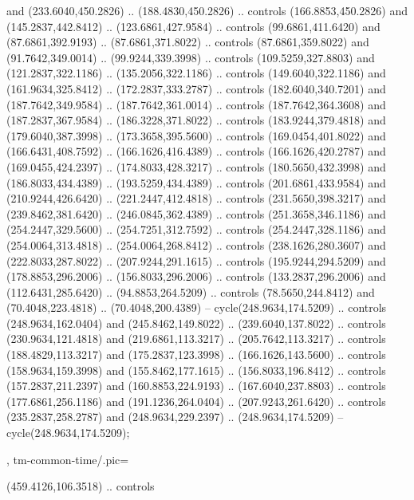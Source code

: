 {{\begin{scope}[y=-0.80pt,x=0.80pt,scale=0.04,yshift=220pt,xshift=-160pt]
        and (233.6040,450.2826) .. (188.4830,450.2826) .. controls (166.8853,450.2826)
        and (145.2837,442.8412) .. (123.6861,427.9584) .. controls (99.6861,411.6420)
        and (87.6861,392.9193) .. (87.6861,371.8022) .. controls (87.6861,359.8022)
        and (91.7642,349.0014) .. (99.9244,339.3998) .. controls (109.5259,327.8803)
        and (121.2837,322.1186) .. (135.2056,322.1186) .. controls (149.6040,322.1186)
        and (161.9634,325.8412) .. (172.2837,333.2787) .. controls (182.6040,340.7201)
        and (187.7642,349.9584) .. (187.7642,361.0014) .. controls (187.7642,364.3608)
        and (187.2837,367.9584) .. (186.3228,371.8022) .. controls (183.9244,379.4818)
        and (179.6040,387.3998) .. (173.3658,395.5600) .. controls (169.0454,401.8022)
        and (166.6431,408.7592) .. (166.1626,416.4389) .. controls (166.1626,420.2787)
        and (169.0455,424.2397) .. (174.8033,428.3217) .. controls (180.5650,432.3998)
        and (186.8033,434.4389) .. (193.5259,434.4389) .. controls (201.6861,433.9584)
        and (210.9244,426.6420) .. (221.2447,412.4818) .. controls (231.5650,398.3217)
        and (239.8462,381.6420) .. (246.0845,362.4389) .. controls (251.3658,346.1186)
        and (254.2447,329.5600) .. (254.7251,312.7592) .. controls (254.2447,328.1186)
        and (254.0064,313.4818) .. (254.0064,268.8412) .. controls (238.1626,280.3607)
        and (222.8033,287.8022) .. (207.9244,291.1615) .. controls (195.9244,294.5209)
        and (178.8853,296.2006) .. (156.8033,296.2006) .. controls (133.2837,296.2006)
        and (112.6431,285.6420) .. (94.8853,264.5209) .. controls (78.5650,244.8412)
        and (70.4048,223.4818) .. (70.4048,200.4389) -- cycle(248.9634,174.5209) ..
        controls (248.9634,162.0404) and (245.8462,149.8022) .. (239.6040,137.8022) ..
        controls (230.9634,121.4818) and (219.6861,113.3217) .. (205.7642,113.3217) ..
        controls (188.4829,113.3217) and (175.2837,123.3998) .. (166.1626,143.5600) ..
        controls (158.9634,159.3998) and (155.8462,177.1615) .. (156.8033,196.8412) ..
        controls (157.2837,211.2397) and (160.8853,224.9193) .. (167.6040,237.8803) ..
        controls (177.6861,256.1186) and (191.1236,264.0404) .. (207.9243,261.6420) ..
        controls (235.2837,258.2787) and (248.9634,229.2397) .. (248.9634,174.5209) --
        cycle(248.9634,174.5209);  
    \end{scope}
  },
  tm-common-time/.pic={
    \begin{scope}[y=-0.80pt,x=0.80pt,scale=0.04,yshift=230pt,xshift=-360pt]
       (459.4126,106.3518) .. controls

\end{scope}}}
